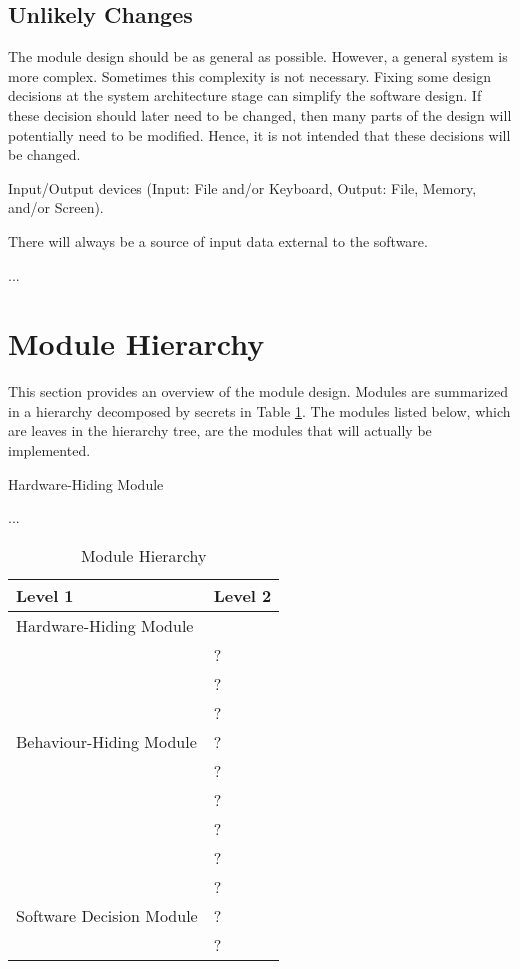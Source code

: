 \documentclass[12pt, titlepage]{article}
\newcommand{\newSection}[1]{
  \newpage
  \section{#1}
}
\newcounter{ucnum}
\newcommand{\uctheucnum}{UC\theucnum}
\newcounter{mnum}
\newcommand{\mthemnum}{M\themnum}
\begin{document}
\subsection{Unlikely Changes} \label{SecUchange}

The module design should be as general as possible. However, a general system is
more complex. Sometimes this complexity is not necessary. Fixing some design
decisions at the system architecture stage can simplify the software design. If
these decision should later need to be changed, then many parts of the design
will potentially need to be modified. Hence, it is not intended that these
decisions will be changed.

\begin{description}
\item[ \uctheucnum \label{ucIO}:] Input/Output devices
  (Input: File and/or Keyboard, Output: File, Memory, and/or Screen).
\item[ \uctheucnum \label{ucInput}:] There will always be
  a source of input data external to the software.
\item ...
\end{description}

\newSection{Module Hierarchy} \label{SecMH}

This section provides an overview of the module design. Modules are summarized
in a hierarchy decomposed by secrets in Table \ref{TblMH}. The modules listed
below, which are leaves in the hierarchy tree, are the modules that will
actually be implemented.

\begin{description}
\item [ \mthemnum \label{mHH}:] Hardware-Hiding Module
\item ...
\end{description}


\begin{table}[h!]
\centering
\begin{tabular}{p{} p{}}
\toprule
\textbf{Level 1} & \textbf{Level 2}\\
\midrule

{Hardware-Hiding Module} & ~ \\
\midrule

\multirow{7}{0.3\textwidth}{Behaviour-Hiding Module} & ?\\
& ?\\
& ?\\
& ?\\
& ?\\
& ?\\
& ?\\ 
& ?\\
\midrule

\multirow{3}{0.3\textwidth}{Software Decision Module} & {?}\\
& ?\\
& ?\\
\bottomrule

\end{tabular}
\caption{Module Hierarchy}
\label{TblMH}
\end{table}
\end{document}
